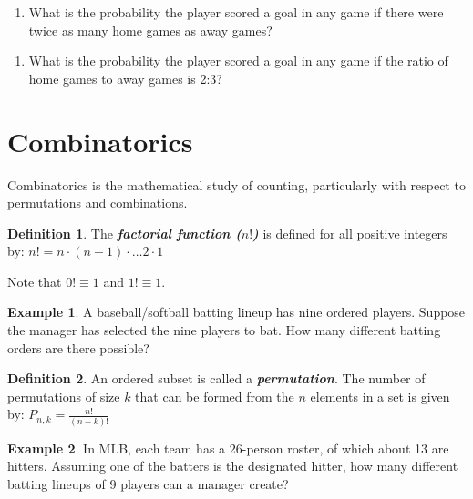 \documentclass[
  11pt,
]{book}
\providecommand{\tightlist}{%
  \setlength{\itemsep}{0pt}\setlength{\parskip}{0pt}}
\theoremstyle{definition}
\newtheorem{definition}{Definition}[chapter]
\theoremstyle{definition}
\newtheorem{example}{Example}[chapter]
\theoremstyle{definition}
\theoremstyle{definition}
\theoremstyle{remark}
\begin{document}
\vfill

\begin{enumerate}
\def\labelenumi{(\alph{enumi})}
\setcounter{enumi}{1}
\tightlist
\item
  What is the probability the player scored a goal in any game if there were twice as many home games as away games?\\
\end{enumerate}

\vfill

\begin{enumerate}
\def\labelenumi{(\alph{enumi})}
\setcounter{enumi}{2}
\tightlist
\item
  What is the probability the player scored a goal in any game if the ratio of home games to away games is 2:3?\\
\end{enumerate}

\vfill

\newpage

\hypertarget{combinatorics}{%
\section{Combinatorics}\label{combinatorics}}

Combinatorics is the mathematical study of counting, particularly with respect to permutations and combinations.

\begin{definition}
The \textbf{\emph{factorial function (\(n!\))}} is defined for all positive integers by: \(n! = n \cdot (n-1) \cdot \ldots 2 \cdot 1\)
\end{definition}

Note that \(0! \equiv 1\) and \(1! \equiv 1\).

\begin{example}
A baseball/softball batting lineup has nine ordered players. Suppose the manager has selected the nine players to bat. How many different batting orders are there possible?
\end{example}

\vfill

\begin{definition}
An ordered subset is called a \textbf{\emph{permutation}}. The number of permutations of size \(k\) that can be formed from the \(n\) elements in a set is given by: \(P_{n,k} = \frac{n!}{(n-k)!}\)
\end{definition}

\begin{example}
In MLB, each team has a 26-person roster, of which about 13 are hitters. Assuming one of the batters is the designated hitter, how many different batting lineups of 9 players can a manager create?
\end{example}
\end{document}
